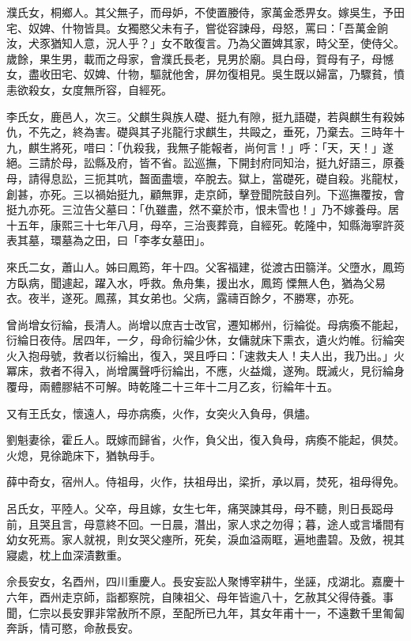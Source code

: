 \begin{pinyinscope}
濮氏女，桐鄉人。其父無子，而母妒，不使置媵侍，家萬金悉畀女。嫁吳生，予田宅、奴婢、什物皆具。女獨愍父未有子，嘗從容諫母，母怒，罵曰：「吾萬金餉汝，犬豕猶知人意，況人乎？」女不敢復言。乃為父置婢其家，時父至，使侍父。歲餘，果生男，載而之母家，會濮氏長老，見男於廟。具白母，賀母有子，母憾女，盡收田宅、奴婢、什物，驅就他舍，屏勿復相見。吳生既以婦富，乃驟貧，憤恚欲殺女，女度無所容，自經死。

李氏女，鹿邑人，次三。父麒生與族人礎、挺九有隙，挺九語礎，若與麒生有殺姊仇，不先之，終為害。礎與其子兆龍行求麒生，共毆之，垂死，乃棄去。三時年十九，麒生將死，唶曰：「仇殺我，我無子能報者，尚何言！」呼：「天，天！」遂絕。三請於母，訟縣及府，皆不省。訟巡撫，下開封府同知治，挺九好語三，原養母，請得息訟，三扼其吭，齧面盡壞，卒脫去。獄上，當礎死，礎自殺。兆龍杖，創甚，亦死。三以禍始挺九，顧無罪，走京師，擊登聞院鼓自列。下巡撫覆按，會挺九亦死。三泣告父墓曰：「仇雖盡，然不棄於市，恨未雪也！」乃不嫁養母。居十五年，康熙三十七年八月，母卒，三治喪葬竟，自經死。乾隆中，知縣海寧許菼表其墓，環墓為之田，曰「李孝女墓田」。

來氏二女，蕭山人。姊曰鳳筠，年十四。父客福建，從渡古田篛洋。父墮水，鳳筠方臥病，聞遽起，躍入水，呼救。魚舟集，援出水，鳳筠慄無人色，猶為父易衣。夜半，遂死。鳳蓀，其女弟也。父病，露禱百餘夕，不勝寒，亦死。

曾尚增女衍綸，長清人。尚增以庶吉士改官，遷知郴州，衍綸從。母病瘓不能起，衍綸日夜侍。居四年，一夕，母命衍綸少休，女傭就床下熏衣，遺火灼帷。衍綸突火入抱母號，救者以衍綸出，復入，哭且呼曰：「速救夫人！夫人出，我乃出。」火冪床，救者不得入，尚增厲聲呼衍綸出，不應，火益熾，遂殉。既滅火，見衍綸身覆母，兩體膠結不可解。時乾隆二十三年十二月乙亥，衍綸年十五。

又有王氏女，懷遠人，母亦病瘓，火作，女突火入負母，俱燼。

劉魁妻徐，霍丘人。既嫁而歸省，火作，負父出，復入負母，病瘓不能起，俱焚。火熄，見徐跪床下，猶執母手。

薛中奇女，宿州人。侍祖母，火作，扶祖母出，梁折，承以肩，焚死，祖母得免。

呂氏女，平陸人。父卒，母且嫁，女生七年，痛哭諫其母，母不聽，則日長跽母前，且哭且言，母意終不回。一日晨，潛出，家人求之勿得；暮，途人或言墦間有幼女死焉。家人就視，則女哭父瘞所，死矣，淚血溢兩眶，遍地盡碧。及斂，視其寢處，枕上血深漬數重。

佘長安女，名酉州，四川重慶人。長安妄訟人聚博宰耕牛，坐誣，戍湖北。嘉慶十六年，酉州走京師，詣都察院，自陳祖父、母年皆逾八十，乞赦其父得侍養。事聞，仁宗以長安罪非常赦所不原，至配所已九年，其女年甫十一，不遠數千里匍匐奔訴，情可愍，命赦長安。


\end{pinyinscope}

